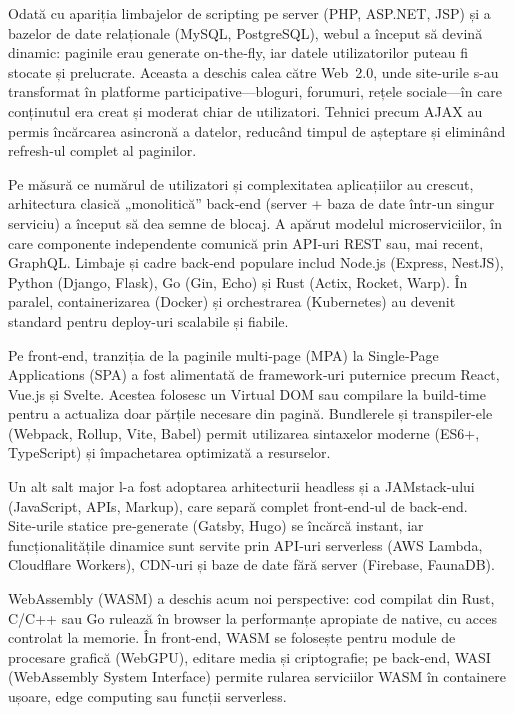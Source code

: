 \documentclass[titlepage,12pt]{article}
\begin{document}
Odată cu apariția limbajelor de scripting pe server (PHP, ASP.NET, JSP) și a bazelor de date relaționale (MySQL, PostgreSQL), webul a început să devină dinamic: paginile erau generate on‑the‑fly, iar datele utilizatorilor puteau fi stocate și prelucrate. Aceasta a deschis calea către Web 2.0, unde site‑urile s-au transformat în platforme participative—bloguri, forumuri, rețele sociale—în care conținutul era creat și moderat chiar de utilizatori. Tehnici precum AJAX au permis încărcarea asincronă a datelor, reducând timpul de așteptare și eliminând refresh‑ul complet al paginilor.

Pe măsură ce numărul de utilizatori și complexitatea aplicațiilor au crescut, arhitectura clasică „monolitică” back‑end (server + baza de date într‑un singur serviciu) a început să dea semne de blocaj. A apărut modelul microserviciilor, în care componente independente comunică prin API‑uri REST sau, mai recent, GraphQL. Limbaje și cadre back‑end populare includ Node.js (Express, NestJS), Python (Django, Flask), Go (Gin, Echo) și Rust (Actix, Rocket, Warp). În paralel, containerizarea (Docker) și orchestrarea (Kubernetes) au devenit standard pentru deploy-uri scalabile și fiabile.

Pe front‑end, tranziția de la paginile multi‑page (MPA) la Single‑Page Applications (SPA) a fost alimentată de framework‑uri puternice precum React, Vue.js și Svelte. Acestea folosesc un Virtual DOM sau compilare la build‑time pentru a actualiza doar părțile necesare din pagină. Bundlerele și transpiler-ele (Webpack, Rollup, Vite, Babel) permit utilizarea sintaxelor moderne (ES6+, TypeScript) și împachetarea optimizată a resurselor.

Un alt salt major l-a fost adoptarea arhitecturii headless și a JAMstack-ului (JavaScript, APIs, Markup), care separă complet front‑end‑ul de back‑end. Site‑urile statice pre‑generate (Gatsby, Hugo) se încărcă instant, iar funcționalitățile dinamice sunt servite prin API‑uri serverless (AWS Lambda, Cloudflare Workers), CDN-uri și baze de date fără server (Firebase, FaunaDB).

WebAssembly (WASM) a deschis acum noi perspective: cod compilat din Rust, C/C++ sau Go rulează în browser la performanțe apropiate de native, cu acces controlat la memorie. În front‑end, WASM se folosește pentru module de procesare grafică (WebGPU), editare media și criptografie; pe back‑end, WASI (WebAssembly System Interface) permite rularea serviciilor WASM în containere ușoare, edge computing sau funcții serverless.
\end{document}
